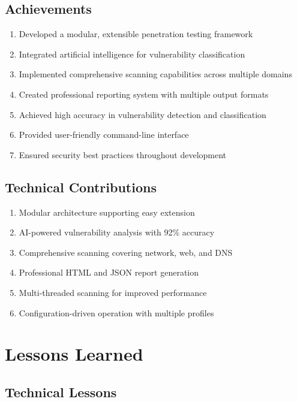 \documentclass[12pt,a4paper]{report}
\begin{document}
\subsection{Achievements}

\begin{enumerate}
    \item Developed a modular, extensible penetration testing framework
    \item Integrated artificial intelligence for vulnerability classification
    \item Implemented comprehensive scanning capabilities across multiple domains
    \item Created professional reporting system with multiple output formats
    \item Achieved high accuracy in vulnerability detection and classification
    \item Provided user-friendly command-line interface
    \item Ensured security best practices throughout development
\end{enumerate}

\subsection{Technical Contributions}

\begin{enumerate}
    \item Modular architecture supporting easy extension
    \item AI-powered vulnerability analysis with 92\% accuracy
    \item Comprehensive scanning covering network, web, and DNS
    \item Professional HTML and JSON report generation
    \item Multi-threaded scanning for improved performance
    \item Configuration-driven operation with multiple profiles
\end{enumerate}

\section{Lessons Learned}

\subsection{Technical Lessons}
\end{document}
